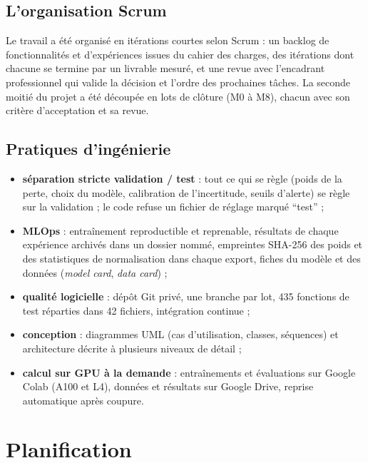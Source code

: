 \subsection{L'organisation Scrum}
Le travail a été organisé en itérations courtes selon Scrum : un backlog de fonctionnalités et
d'expériences issues du cahier des charges, des itérations dont chacune se termine par un
livrable mesuré, et une revue avec l'encadrant professionnel qui valide la décision et l'ordre des
prochaines tâches. La seconde moitié du projet a été découpée en lots de clôture (M0 à M8), chacun
avec son critère d'acceptation et sa revue. 

\subsection{Pratiques d'ingénierie}
\begin{itemize}
  \item \textbf{séparation stricte validation / test} : tout ce qui se règle (poids de la perte,
        choix du modèle, calibration de l'incertitude, seuils d'alerte) se règle sur la validation ;
        le code refuse un fichier de réglage marqué \enquote{test} ;
  \item \textbf{MLOps} : entraînement reproductible et reprenable, résultats de chaque expérience
        archivés dans un dossier nommé, empreintes SHA-256 des poids et des statistiques de
        normalisation dans chaque export, fiches du modèle et des données (\emph{model card},
        \emph{data card}) ;
  \item \textbf{qualité logicielle} : dépôt Git privé, une branche par lot, 435 fonctions de test
        réparties dans 42 fichiers, intégration continue ;
  \item \textbf{conception} : diagrammes UML (cas d'utilisation, classes, séquences) et
        architecture décrite à plusieurs niveaux de détail ;
  \item \textbf{calcul sur GPU à la demande} : entraînements et évaluations sur Google Colab
        (A100 et L4), données et résultats sur Google Drive, reprise automatique après coupure.
\end{itemize}

\section{Planification}

